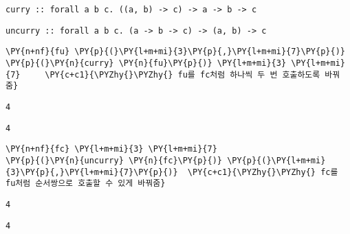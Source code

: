     
    \begin{Verbatim}[commandchars=\\\{\}]
curry :: forall a b c. ((a, b) -> c) -> a -> b -> c
    \end{Verbatim}

    
    
    \begin{Verbatim}[commandchars=\\\{\}]
uncurry :: forall a b c. (a -> b -> c) -> (a, b) -> c
    \end{Verbatim}

    
    \begin{tcolorbox}[breakable, size=fbox, boxrule=1pt, pad at break*=1mm,colback=cellbackground, colframe=cellborder, top=.75ex]
\begin{Verbatim}[commandchars=\\\{\}]
\PY{n+nf}{fu} \PY{p}{(}\PY{l+m+mi}{3}\PY{p}{,}\PY{l+m+mi}{7}\PY{p}{)}
\PY{p}{(}\PY{n}{curry} \PY{n}{fu}\PY{p}{)} \PY{l+m+mi}{3} \PY{l+m+mi}{7}     \PY{c+c1}{\PYZhy{}\PYZhy{} fu를 fc처럼 하나씩 두 번 호출하도록 바꿔줌}
\end{Verbatim}
\end{tcolorbox}

    
    \begin{Verbatim}[commandchars=\\\{\}]
4
    \end{Verbatim}

    
    
    \begin{Verbatim}[commandchars=\\\{\}]
4
    \end{Verbatim}

    
    \begin{tcolorbox}[breakable, size=fbox, boxrule=1pt, pad at break*=1mm,colback=cellbackground, colframe=cellborder, top=.75ex]
\begin{Verbatim}[commandchars=\\\{\}]
\PY{n+nf}{fc} \PY{l+m+mi}{3} \PY{l+m+mi}{7}
\PY{p}{(}\PY{n}{uncurry} \PY{n}{fc}\PY{p}{)} \PY{p}{(}\PY{l+m+mi}{3}\PY{p}{,}\PY{l+m+mi}{7}\PY{p}{)}  \PY{c+c1}{\PYZhy{}\PYZhy{} fc를 fu처럼 순서쌍으로 호출할 수 있게 바꿔줌}
\end{Verbatim}
\end{tcolorbox}

    
    \begin{Verbatim}[commandchars=\\\{\}]
4
    \end{Verbatim}

    
    
    \begin{Verbatim}[commandchars=\\\{\}]
4
    \end{Verbatim}

    

    
    
    
